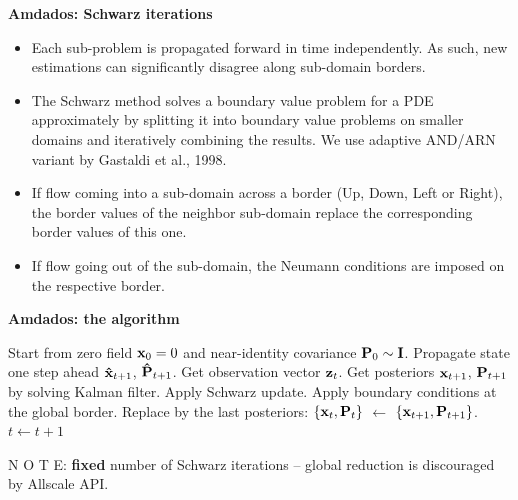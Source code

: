 \documentclass[12pt]{beamer}
\newcommand{\myTitle}{\rmfamily\bfseries}
\begin{document}
\begin{frame}{\myTitle Amdados: Schwarz iterations}
\begin{itemize}
\item Each sub-problem is propagated forward in time independently. As such, new estimations can significantly disagree along sub-domain borders.
\item The Schwarz method solves a boundary value problem for a PDE approximately by splitting it into boundary value problems on smaller domains and iteratively combining the results. We use adaptive AND/ARN variant by Gastaldi et al., 1998.
\item If flow coming into a sub-domain across a border (Up, Down, Left or Right), the border values of the neighbor sub-domain replace the corresponding border values of this one.
\item If flow going out of the sub-domain, the Neumann conditions are imposed on the respective border.
\end{itemize}
\end{frame}

\begin{frame}{\myTitle Amdados: the algorithm}
\begin{algorithmic}[1]
\State Start from zero field ${\bf x}_0 = 0$ and near-identity covariance ${\bf P}_0 \sim {\bf I}$. 
	\State Propagate state one step ahead ${\bf\hat x}_{t+1}$, ${\bf\hat P}_{t+1}$.
	\State Get observation vector ${\bf z}_t$.
		\State Get posteriors ${\bf x}_{t+1}$, ${\bf P}_{t+1}$ by solving Kalman filter.
		\State Apply Schwarz update.
		\State Apply boundary conditions at the global border. 
	\EndFor
	\State Replace by the last posteriors: $\{{\bf x}_t, {\bf P}_t\}$ $\leftarrow$ $\{{\bf x}_{t+1}, {\bf P}_{t+1}\}$.
	\State $t \leftarrow t + 1$
\EndFor
\end{algorithmic}
\vspace{1em}
N O T E: \textbf{fixed} number of Schwarz iterations -- global reduction is discouraged by Allscale API.
\end{frame}
\end{document}
